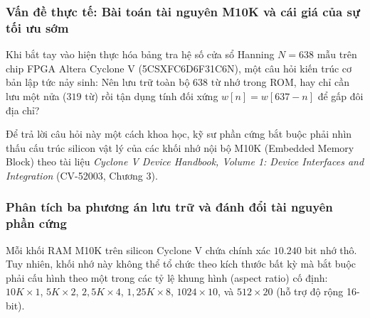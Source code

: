 \subsubsection*{Vấn đề thực tế: Bài toán tài nguyên M10K và cái giá của sự tối ưu sớm}
Khi bắt tay vào hiện thực hóa bảng tra hệ số cửa sổ Hanning $N = 638\text{ mẫu}$ trên chip FPGA Altera Cyclone V (5CSXFC6D6F31C6N), một câu hỏi kiến trúc cơ bản lập tức nảy sinh: Nên lưu trữ toàn bộ $638\text{ từ}$ nhớ trong ROM, hay chỉ cần lưu một nửa ($319\text{ từ}$) rồi tận dụng tính đối xứng $w[n] = w[637 - n]$ để gấp đôi địa chỉ?

Để trả lời câu hỏi này một cách khoa học, kỹ sư phần cứng bắt buộc phải nhìn thấu cấu trúc silicon vật lý của các khối nhớ nội bộ M10K (Embedded Memory Block) theo tài liệu \emph{Cyclone V Device Handbook, Volume 1: Device Interfaces and Integration} (CV-52003, Chương 3).

\subsubsection*{Phân tích ba phương án lưu trữ và đánh đổi tài nguyên phần cứng}
Mỗi khối RAM M10K trên silicon Cyclone V chứa chính xác $10.240\text{ bit}$ nhớ thô. Tuy nhiên, khối nhớ này không thể tổ chức theo kích thước bất kỳ mà bắt buộc phải cấu hình theo một trong các tỷ lệ khung hình (aspect ratio) cố định: $10K \times 1$, $5K \times 2$, $2{,}5K \times 4$, $1{,}25K \times 8$, $1024 \times 10$, và $512 \times 20$ (hỗ trợ độ rộng 16-bit).

